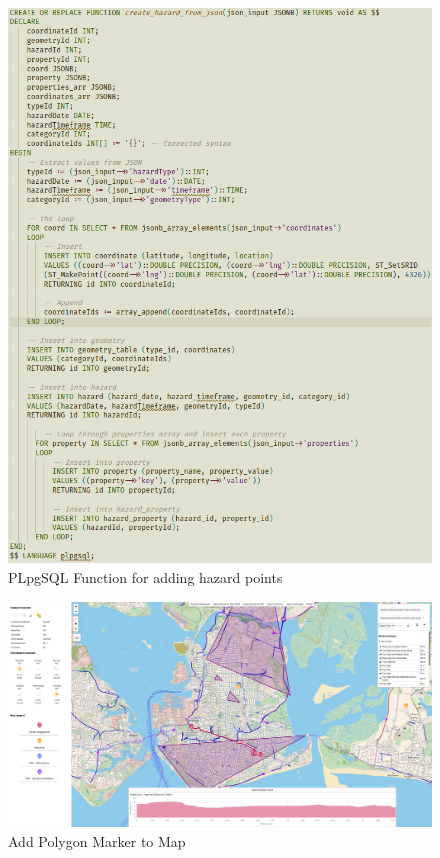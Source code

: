 \begin{figure}[!ht]
    \centering
    \includegraphics[width=425px]{figures/Progress Images/Iteration-2/SR32-37/sr32-add-hazard-point-sql.png}
    \caption{PLpgSQL Function for adding hazard points}
    \label{fig:plpgsql-func}
\end{figure}

\begin{figure}[!ht]
    \centering
    \includegraphics[width=425px]{figures/Progress Images/Iteration-2/SR32-37/sr32-add-polygon-marker-to-map.png}
    \caption{Add Polygon Marker to Map}
    \label{fig:add-polygon-marker}
\end{figure}

